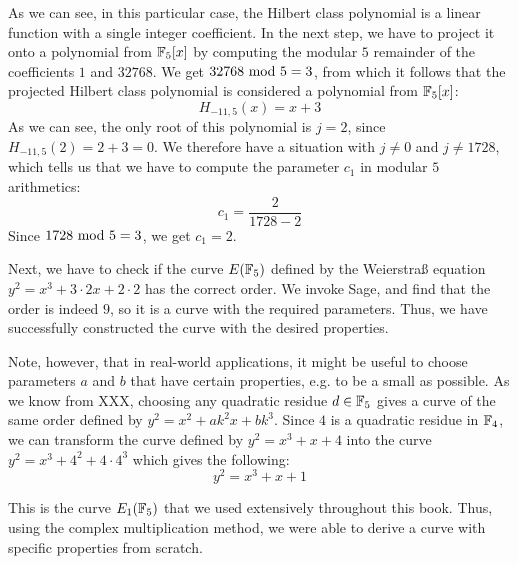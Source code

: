 \begin{example}
As we can see, in this particular case, the Hilbert class polynomial is a linear function with a single integer coefficient. In the next step, we have to project it onto a polynomial from $\mathbb{F}_5[x]$ by computing the modular $5$ remainder of the coefficients $1$ and $32768$. We get $32768 \text{ mod } 5=3$, from which it follows that the projected Hilbert class polynomial is considered a polynomial from $\mathbb{F}_5[x]$:
$$
H_{-11,5}(x)=x+3
$$ 
 As we can see, the only root of this polynomial is $j=2$, since $H_{-11,5}(2)=2+3=0$. We therefore have a situation with $j\neq 0$ and $j\neq 1728$, which tells us that we have to compute the parameter $c_1$ in modular $5$ arithmetics:
$$
c_1=\frac{2}{1728-2}
$$
 Since $1728 \text{ mod } 5=3$, we get $c_1=2$. 
 
 Next, we have to check if the curve $E(\mathbb{F}_5)$ defined by the Weierstraß equation  $y^2 = x^3 + 3\cdot 2 x + 2\cdot 2$ has the correct order. We invoke Sage, and find that the order is indeed $9$, so it is a curve with the required parameters. Thus, we have successfully constructed the curve with the desired properties.

Note, however, that in real-world applications, it might be useful to choose parameters $a$ and $b$ that have certain properties, e.g. to be a small as possible. As we know from XXX, choosing any quadratic residue $d\in \mathbb{F}_5$ gives a curve of the same order defined by $y^2 = x^2 + a k^2 x + bk^3$. Since $4$ is a quadratic residue in $\mathbb{F}_4$, we can transform the curve defined by 
$y^2 = x^3 +x+4$ into the curve $y^2 = x^3 + 4^2 + 4\cdot 4^3$ which gives the following:
$$
y^2 = x^3 + x +1
$$

This is the curve $E_1(\mathbb{F}_5)$ that we used extensively throughout this book. Thus, using the complex multiplication method, we were able to derive a curve with specific properties from scratch.
\end{example}

